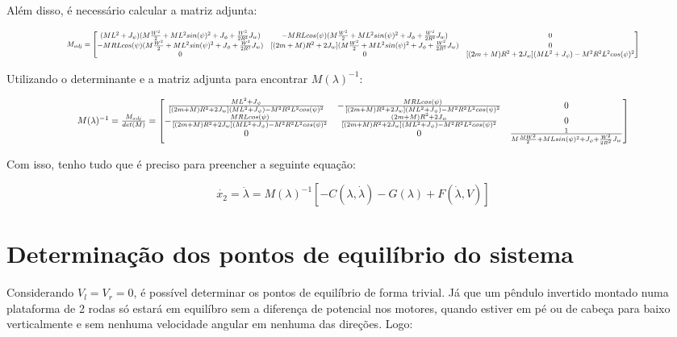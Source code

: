 \documentclass[10pt]{article}
\begin{document}
\quad Além disso, é necessário calcular a matriz adjunta:

\begin{equation}
    \scalebox{0.65}{$
    M_{adj} =
    \begin{bmatrix}
        (ML^2 + J_\psi)(M\frac{W^2}{2}+ML^2sin(\psi)^2+J_{\phi}+\frac{W^2}{2R^2}J_w) & -MRLcos(\psi)(M\frac{W^2}{2}+ML^2sin(\psi)^2+J_{\phi}+\frac{W^2}{2R^2}J_w) & 0 \\
        -MRLcos(\psi)(M\frac{W^2}{2}+ML^2sin(\psi)^2+J_{\phi}+\frac{W^2}{2R^2}J_w) & [(2m + M)R^2 + 2J_w](M\frac{W^2}{2}+ML^2sin(\psi)^2+J_{\phi}+\frac{W^2}{2R^2}J_w) & 0 \\
        0 & 0 & [(2m + M)R^2 + 2J_w](ML^2 + J_\psi) - M^2R^2L^2cos(\psi)^2
    \end{bmatrix}
    $}
\end{equation}

\quad Utilizando o determinante e a matriz adjunta para encontrar $M(\lambda)^{-1}$:

\begin{equation}
    \scalebox{0.8}{$
    M(\lambda)^{-1} = \frac{M_{adj}}{det(M)} =
    \begin{bmatrix}
        \frac{ML^2 + J_\psi}{[(2m + M)R^2 + 2J_w](ML^2 + J_\psi) - M^2R^2L^2cos(\psi)^2} & -\frac{MRLcos(\psi)}{[(2m + M)R^2 + 2J_w](ML^2 + J_\psi) - M^2R^2L^2cos(\psi)^2} & 0 \\
        -\frac{MRLcos(\psi)}{[(2m + M)R^2 + 2J_w](ML^2 + J_\psi) - M^2R^2L^2cos(\psi)^2} & \frac{(2m + M)R^2 + 2J_w}{[(2m + M)R^2 + 2J_w](ML^2 + J_\psi) - M^2R^2L^2cos(\psi)^2} & 0 \\
        0 & 0 & \frac{1}{M\frac{MW^2}{2} + MLsin(\psi)^2 + J_\phi + \frac{W^2}{2R^2}J_w}
    \end{bmatrix}
    $}
\end{equation}

\quad Com isso, tenho tudo que é preciso para preencher a seguinte equação:

\begin{equation}
    \dot{x_2} = \ddot\lambda = M(\lambda)^{-1} \left[ -C(\lambda,\dot\lambda) - G(\lambda) + F(\dot\lambda,V) \right]
\end{equation}

\section{Determinação dos pontos de equilíbrio do sistema}

\quad Considerando $V_l = V_r = 0$, é possível determinar os pontos de equilíbrio de forma trivial.
Já que um pêndulo invertido montado numa plataforma de 2 rodas só estará em equilíbro sem a diferença de potencial nos motores,
quando estiver em pé ou de cabeça para baixo verticalmente e sem nenhuma velocidade angular em nenhuma das direções. Logo:
\end{document}
